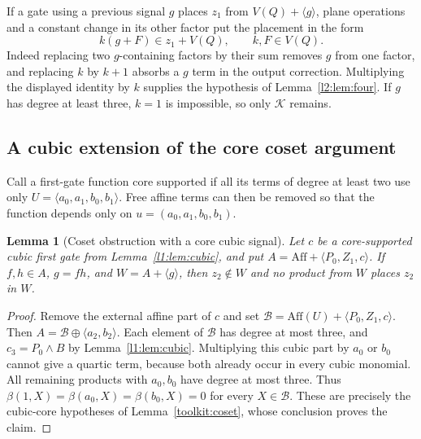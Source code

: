 \documentclass[11pt,a4paper]{article}
\theoremstyle{plain}
\newtheorem{lemma}[theorem]{Lemma}
\theoremstyle{remark}
\newcommand{\Aff}{\mathrm{Aff}}
\begin{document}
If a gate using a previous signal $g$ places $z_1$ from $V(Q)+\langle g\rangle$, plane operations and a constant change in its other factor put the placement in the form
\[
k(g+F)\in z_1+V(Q),\qquad k,F\in V(Q).
\]
Indeed replacing two $g$-containing factors by their sum removes $g$ from one factor, and replacing $k$ by $k+1$ absorbs a $g$ term in the output correction. Multiplying the displayed identity by $k$ supplies the hypothesis of Lemma~\ref{l2:lem:four}. If $g$ has degree at least three, $k=1$ is impossible, so only $\mathcal K$ remains.

\subsection{A cubic extension of the core coset argument}
Call a first-gate function core supported if all its terms of degree at least two use only $U=\langle a_0,a_1,b_0,b_1\rangle$. Free affine terms can then be removed so that the function depends only on $u=(a_0,a_1,b_0,b_1)$.

\begin{lemma}[Coset obstruction with a core cubic signal]\label{l1:lem:corecoset}
Let $c$ be a core-supported cubic first gate from Lemma~\ref{l1:lem:cubic}, and put $A=\Aff+\langle P_0,Z_1,c\rangle$. If $f,h\in A$, $g=fh$, and $W=A+\langle g\rangle$, then $z_2\notin W$ and no product from $W$ places $z_2$ in $W$.
\end{lemma}
\begin{proof}
Remove the external affine part of $c$ and set $\mathcal B=\Aff(U)+\langle P_0,Z_1,c\rangle$. Then $A=\mathcal B\oplus\langle a_2,b_2\rangle$. Each element of $\mathcal B$ has degree at most three, and $c_3=P_0\wedge B$ by Lemma~\ref{l1:lem:cubic}. Multiplying this cubic part by $a_0$ or $b_0$ cannot give a quartic term, because both already occur in every cubic monomial. All remaining products with $a_0,b_0$ have degree at most three. Thus $\beta(1,X)=\beta(a_0,X)=\beta(b_0,X)=0$ for every $X\in\mathcal B$. These are precisely the cubic-core hypotheses of Lemma~\ref{toolkit:coset}, whose conclusion proves the claim.
\end{proof}
\end{document}
